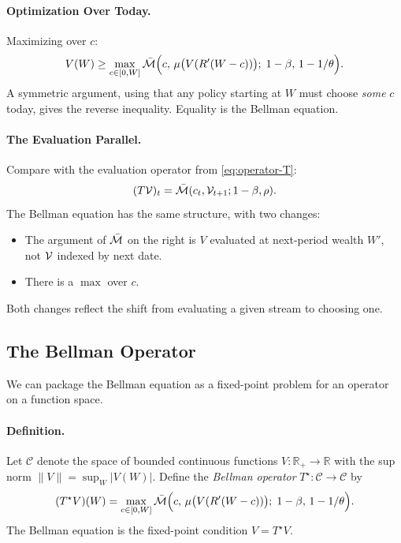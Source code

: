 \paragraph{Optimization Over Today.}
Maximizing over $c$:
\begin{equation}
V(W) \geq \max_{c \in [0, W]} \bar{\mathcal{M}}\Big( c, \, \mu\big( V(R'(W - c)) \big); \; 1-\beta, \, 1-1/\theta \Big).
\label{eq:bellman-ge}
\end{equation}
A symmetric argument, using that any policy starting at $W$ must choose \emph{some} $c$ today, gives the reverse inequality. Equality is the Bellman equation.

\paragraph{The Evaluation Parallel.}
Compare with the evaluation operator from \cref{eq:operator-T}:
\begin{equation}
(T\mathcal{V})_t = \bar{\mathcal{M}}(c_t, \mathcal{V}_{t+1}; 1-\beta, \rho).
\end{equation}
The Bellman equation has the same structure, with two changes:
\begin{itemize}[leftmargin=2em]
    \item The argument of $\bar{\mathcal{M}}$ on the right is $V$ evaluated at next-period wealth $W'$, not $\mathcal{V}$ indexed by next date.
    \item There is a $\max$ over $c$.
\end{itemize}
Both changes reflect the shift from evaluating a given stream to choosing one.

\subsection{The Bellman Operator}
\label{subsec:dp-bellman-operator}

We can package the Bellman equation as a fixed-point problem for an operator on a function space.

\paragraph{Definition.}
Let $\mathcal{C}$ denote the space of bounded continuous functions $V: \mathbb{R}_+ \to \mathbb{R}$ with the sup norm $\|V\| = \sup_W |V(W)|$. Define the \emph{Bellman operator} $T^\star: \mathcal{C} \to \mathcal{C}$ by
\begin{equation}
(T^\star V)(W) = \max_{c \in [0, W]} \bar{\mathcal{M}}\Big( c, \, \mu\big( V(R'(W-c)) \big); \; 1-\beta, \, 1-1/\theta \Big).
\label{eq:bellman-operator}
\end{equation}
The Bellman equation is the fixed-point condition $V = T^\star V$.

